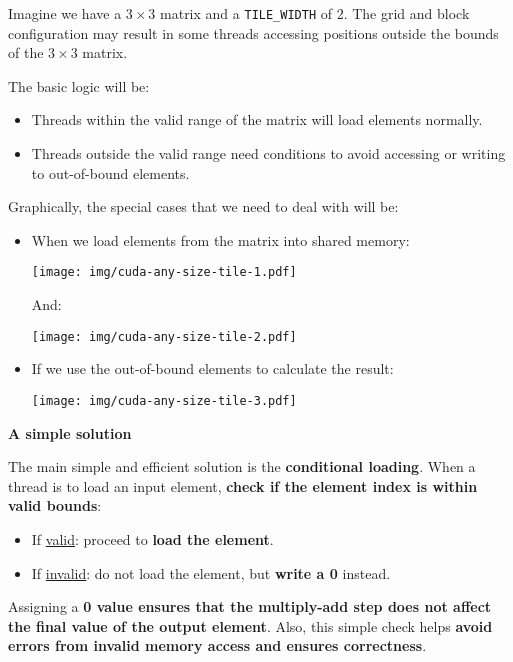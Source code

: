 \begin{examplebox}
    Imagine we have a $3 \times 3$ matrix and a \texttt{TILE\_WIDTH} of 2. The grid and block configuration may result in some threads accessing positions outside the bounds of the $3 \times 3$ matrix.

    The basic logic will be:
    \begin{itemize}
        \item Threads within the valid range of the matrix will load elements normally.
        \item Threads outside the valid range need conditions to avoid accessing or writing to out-of-bound elements.
    \end{itemize}

    Graphically, the special cases that we need to deal with will be:
    \begin{itemize}
        \item When we load elements from the matrix into shared memory:
        \begin{center}
            \texttt{[image: img/cuda-any-size-tile-1.pdf]}
        \end{center}
        And:
        \begin{center}
            \texttt{[image: img/cuda-any-size-tile-2.pdf]}
        \end{center}

        \item If we use the out-of-bound elements to calculate the result:
        \begin{center}
            \texttt{[image: img/cuda-any-size-tile-3.pdf]}
        \end{center}
    \end{itemize}
\end{examplebox}

\highspace
\begin{flushleft}
    \textcolor{Green3}{ \textbf{A simple solution}}
\end{flushleft}
The main simple and efficient solution is the \textbf{conditional loading}. When a thread is to load an input element, \textbf{check if the element index is within valid bounds}:
\begin{itemize}
    \item If \underline{valid}: proceed to \textbf{load the element}.
    \item If \underline{invalid}: do not load the element, but \textbf{write a 0} instead.
\end{itemize}
Assigning a \textbf{0 value ensures that the multiply-add step does not affect the final value of the output element}. Also, this simple check helps \textbf{avoid errors from invalid memory access and ensures correctness}.

